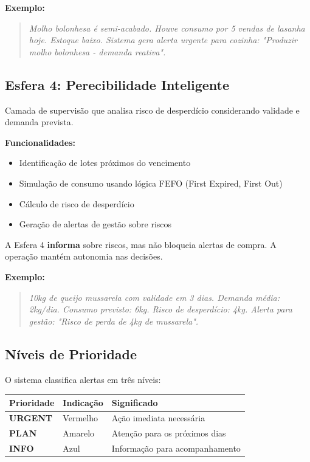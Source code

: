 \textbf{Exemplo:}

\begin{quote}
\textit{Molho bolonhesa é semi-acabado. Houve consumo por 5 vendas de lasanha
hoje. Estoque baixo. Sistema gera alerta urgente para cozinha:
"Produzir molho bolonhesa - demanda reativa".}
\end{quote}

\subsection{Esfera 4: Perecibilidade Inteligente}

Camada de supervisão que analisa risco de desperdício considerando
validade e demanda prevista.

\textbf{Funcionalidades:}

\begin{itemize}[leftmargin=2em]
  \item Identificação de lotes próximos do vencimento
  \item Simulação de consumo usando lógica FEFO (First Expired, First Out)
  \item Cálculo de risco de desperdício
  \item Geração de alertas de gestão sobre riscos
\end{itemize}

\begin{infobox}
A Esfera 4 \textbf{informa} sobre riscos, mas não bloqueia alertas de compra.
A operação mantém autonomia nas decisões.
\end{infobox}

\textbf{Exemplo:}

\begin{quote}
\textit{10kg de queijo mussarela com validade em 3 dias. Demanda média: 2kg/dia.
Consumo previsto: 6kg. Risco de desperdício: 4kg. Alerta para gestão:
"Risco de perda de 4kg de mussarela".}
\end{quote}

\subsection{Níveis de Prioridade}

O sistema classifica alertas em três níveis:

\begin{center}
\begin{tabular}{>{\bfseries}l l p{7cm}}
\toprule
Prioridade & Indicação & Significado \\
\midrule
URGENT & Vermelho & Ação imediata necessária \\
PLAN   & Amarelo  & Atenção para os próximos dias \\
INFO   & Azul     & Informação para acompanhamento \\
\bottomrule
\end{tabular}
\end{center}

